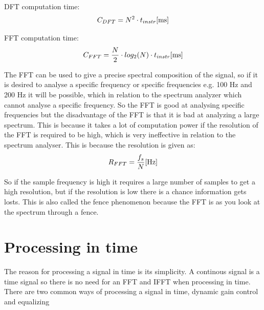DFT computation time:
\begin{equation}
C_{DFT} = N^{2}\cdot t_{instr} \enhed{ms}
\end{equation}
\begin{where}
\end{where}

FFT computation time:
\begin{equation}
C_{FFT} = \frac{N}{2}\cdot log_{2}(N)\cdot t_{instr} \enhed{ms}
\end{equation}
\begin{where}
\end{where}

The FFT can be used to give a precise spectral composition of the signal, so if it is desired to analyse a specific frequency or specific frequencies e.g. 100 Hz and 200 Hz it will be possible, which in relation to the spectrum analyzer which cannot analyse a specific frequency. So the FFT is good at analysing specific frequencies but the disadvantage of the FFT is that it is bad at analyzing a large spectrum. This is because it takes a lot of computation power if the resolution of the FFT is required to be high, which is very ineffective in relation to the spectrum analyser. This is because the resolution is given as:
\begin{equation}
R_{FFT} = \frac{f_s}{N} \enhed{Hz}
\end{equation}
\begin{where}
\end{where} 

So if the sample frequency is high it requires a large number of samples to get a high resolution, but if the resolution is low there is a chance information gets losts. This is also called the fence phenomenon because the FFT is as you look at the spectrum through a fence. 









\section{Processing in time}
The reason for processing a signal in time is its simplicity. A continous signal is a time signal so there is no need for an FFT and IFFT when processing in time. There are two common ways of processing a signal in time, dynamic gain control and equalizing  



